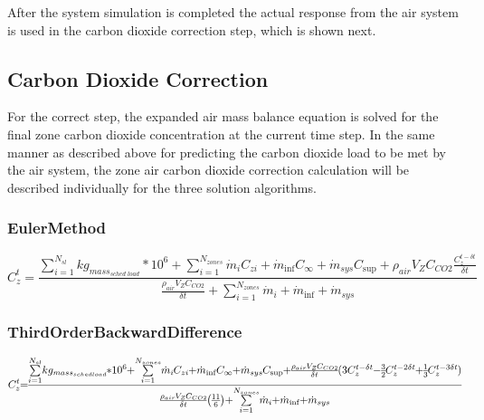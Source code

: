 After the system simulation is completed the actual response from the air system is used in the carbon dioxide correction step, which is shown next.

\subsection{Carbon Dioxide Correction}\label{carbon-dioxide-correction}

For the correct step, the expanded air mass balance equation is solved for the final zone carbon dioxide concentration at the current time step. In the same manner as described above for predicting the carbon dioxide load to be met by the air system, the zone air carbon dioxide correction calculation will be described individually for the three solution algorithms.

\subsubsection{EulerMethod}\label{eulermethod-1}

\begin{equation}
C_z^t = \frac{{\sum\limits_{i = 1}^{{N_{sl}}} {k{g_{mas{s_{sched\;load}}}}*{{10}^6}}  + \sum\limits_{i = 1}^{{N_{zones}}} {{{\dot m}_i}} {C_{zi}} + {{\dot m}_{\inf }}{C_\infty } + {{\dot m}_{sys}}{C_{\sup }} + {\rho_{air}}{V_Z}{C_{CO2}}\frac{{C_z^{t - \delta t}}}{{\delta t}}}}{{\frac{{{\rho_{air}}{V_Z}{C_{CO2}}}}{{\delta t}} + \sum\limits_{i = 1}^{{N_{zones}}} {{{\dot m}_i}}  + {{\dot m}_{\inf }} + {{\dot m}_{sys}}}}
\end{equation}

\subsubsection{ThirdOrderBackwardDifference}\label{thirdorderbackwarddifference-1}

\begin{equation}
\medmuskip=0mu
\thinmuskip=0mu
\thickmuskip=0mu
\nulldelimiterspace=0pt
\scriptspace=0pt
C_z^t = \frac{{\sum\limits_{i = 1}^{{N_{sl}}} {k{g_{mas{s_{sched\;load}}}}*{{10}^6}}  + \sum\limits_{i = 1}^{{N_{zones}}} {{{\dot m}_i}} {C_{zi}} + {{\dot m}_{\inf }}{C_\infty } + {{\dot m}_{sys}}{C_{\sup }} + \frac{{{\rho_{air}}{V_Z}{C_{CO2}}}}{{\delta t}}(3C_z^{t - \delta t} - \frac{3}{2}C_z^{t - 2\delta t} + \frac{1}{3}C_z^{t - 3\delta t})}}{{\frac{{{\rho_{air}}{V_Z}{C_{CO2}}}}{{\delta t}}\left( {\frac{{11}}{6}} \right) + \sum\limits_{i = 1}^{{N_{zones}}} {{{\dot m}_i}}  + {{\dot m}_{\inf }} + {{\dot m}_{sys}}}}
\end{equation}

